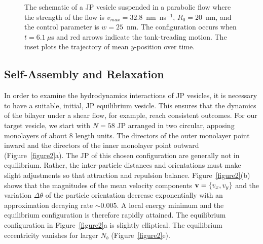 \documentclass[lineno]{jfm}
\begin{document}
\begin{figure}
\centering
  \caption{\label{figure7} The schematic of a JP vesicle suspended in a
  parabolic flow where the strength of the flow is
  $v_{max}=32.8$~nm~ns$^{-1}$, $R_0 = 20$~nm, and the control parameter
  is $w=25$~nm. The configuration occurs when $t=6.1\ \mu$s and red arrows indicate the tank-treading motion. The inset plots the trajectory of mean $y$-position over time.}
\end{figure}



\subsection{Self-Assembly and Relaxation}


In order to examine the hydrodynamics interactions of JP vesicles, it is
necessary to have a suitable, initial, JP equilibrium vesicle. This
ensures that the dynamics of the bilayer under a shear flow, for
example, reach consistent outcomes. For our target vesicle, we start
with $N=58$ JP arranged in two circular, apposing monolayers of about
$8$ length units. The directors of the outer monolayer point inward and
the directors of the inner monolayer point outward
(Figure~\ref{figure2}a).  The JP of this chosen configuration are
generally not in equilibrium.  Rather, the inter-particle distances and
orientations must make slight adjustments so that attraction and
repulsion balance.  Figure~\ref{figure2}(b) shows that the magnitudes of
the mean velocity components ${\bf v}=\{v_x,v_y\}$ and the variation
$\Delta \theta$ of the particle orientation decrease exponentially with
an approximation decaying rate $\sim0.005$. A local energy minimum and
the equilibrium configuration is therefore rapidly attained. The
equilibrium configuration in Figure~\ref{figure2}a is slightly
elliptical. The equilibrium eccentricity vanishes for larger $N_b$
(Figure~\ref{figure2}e).
\end{document}
